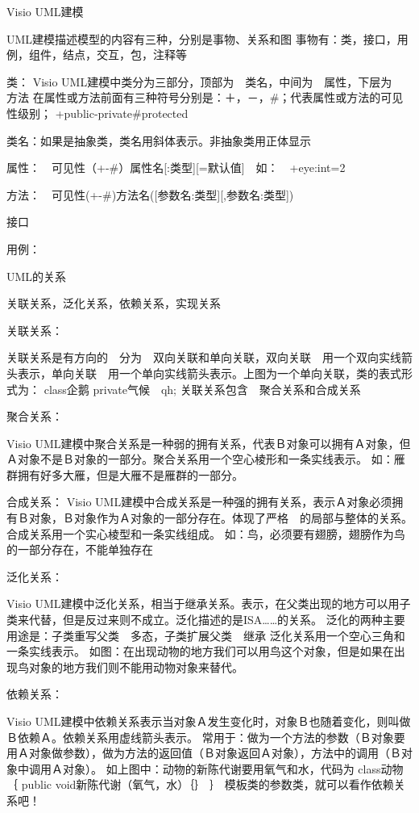 \documentclass[a4paper,11pt]{book}
\begin{document}
Visio  UML建模

UML建模描述模型的内容有三种，分别是事物、关系和图
事物有：类，接口，用例，组件，结点，交互，包，注释等

类：
Visio  UML建模中类分为三部分，顶部为　类名，中间为　属性，下层为　方法
在属性或方法前面有三种符号分别是：＋，－，\#；代表属性或方法的可见性级别；
+public-private\#protected

类名：如果是抽象类，类名用斜体表示。非抽象类用正体显示

属性：　可见性（+-\#）属性名[:类型][=默认值]　如：　+eye:int=2

方法：　可见性(+-\#)方法名([参数名:类型][,参数名:类型])


接口

用例：


UML的关系

关联关系，泛化关系，依赖关系，实现关系

关联关系：

关联关系是有方向的　分为　双向关联和单向关联，双向关联　用一个双向实线箭头表示，单向关联　用一个单向实线箭头表示。上图为一个单向关联，类的表式形式为：
class企鹅{
private气候　qh;
}
关联关系包含　聚合关系和合成关系

聚合关系：

Visio  UML建模中聚合关系是一种弱的拥有关系，代表Ｂ对象可以拥有Ａ对象，但Ａ对象不是Ｂ对象的一部分。聚合关系用一个空心棱形和一条实线表示。
如：雁群拥有好多大雁，但是大雁不是雁群的一部分。

合成关系：
Visio  UML建模中合成关系是一种强的拥有关系，表示Ａ对象必须拥有Ｂ对象，Ｂ对象作为Ａ对象的一部分存在。体现了严格　的局部与整体的关系。合成关系用一个实心棱型和一条实线组成。
如：鸟，必须要有翅膀，翅膀作为鸟的一部分存在，不能单独存在

泛化关系：

Visio  UML建模中泛化关系，相当于继承关系。表示，在父类出现的地方可以用子类来代替，但是反过来则不成立。泛化描述的是ISA……的关系。
泛化的两种主要用途是：子类重写父类　多态，子类扩展父类　继承
泛化关系用一个空心三角和一条实线表示。
如图：在出现动物的地方我们可以用鸟这个对象，但是如果在出现鸟对象的地方我们则不能用动物对象来替代。

依赖关系：

Visio  UML建模中依赖关系表示当对象Ａ发生变化时，对象Ｂ也随着变化，则叫做Ｂ依赖Ａ。依赖关系用虚线箭头表示。
常用于：做为一个方法的参数（Ｂ对象要用Ａ对象做参数），做为方法的返回值（Ｂ对象返回Ａ对象），方法中的调用（Ｂ对象中调用Ａ对象）。
如上图中：动物的新陈代谢要用氧气和水，代码为
class动物｛
public void新陈代谢（氧气，水）｛｝
｝
 模板类的参数类，就可以看作依赖关系吧！
\end{document}
